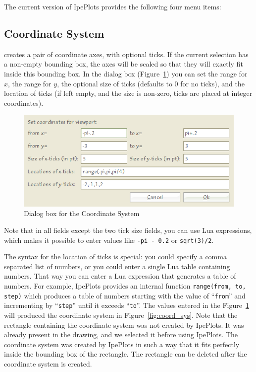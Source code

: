 \documentclass{article}
\begin{document}
The current version of IpePlots provides the following four menu items:

\subsection{Coordinate System}
creates a pair of coordinate axes, with optional ticks. If the current
selection has a non-empty bounding box, the axes will be scaled so that they
will exactly fit inside this bounding box. In the dialog box
(Figure~\ref{fig:coord_sys_dialog}) you can set the range for $x$, the range for
$y$, the optional size of ticks (defaults to 0 for no ticks), and the location
of ticks (if left empty, and the size is non-zero, ticks are placed at integer
coordinates). 

\begin{figure}[h]
   \begin{center}
      \includegraphics[scale=3]{coord_sys_dialog.png}
   \end{center}
   \caption{Dialog box for the Coordinate System}
   \label{fig:coord_sys_dialog}
\end{figure}

Note that in all fields except the two tick size fields, you can use Lua
expressions, which makes it possible to enter values like \texttt{-pi - 0.2} or
\texttt{sqrt(3)/2}. 

The syntax for the location of ticks is special: you could specify a comma
separated list of numbers, or you could enter a single Lua table containing
numbers.  That way you can enter a Lua expression that generates a table of
numbers.  For example, IpePlots provides an internal function
\texttt{range(from, to, step)} which produces a table of numbers starting with
the value of ``\texttt{from}'' and incrementing by ``\texttt{step}'' until it
exceeds ``\texttt{to}''.  The values entered in the
Figure~\ref{fig:coord_sys_dialog} will produced the coordinate system in
Figure~\ref{fig:coord_sys}. Note that the rectangle containing the coordinate
system was not created by IpePlots.  It was already present in the drawing, and
we selected it before using IpePlots.  The coordinate system was created by
IpePlots in such a way that it fits perfectly inside the bounding box of the
rectangle. The rectangle can be deleted after the coordinate system is created. 
\end{document}
